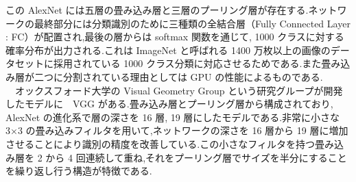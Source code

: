 この AlexNet には五層の畳み込み層と三層のプーリング層が存在する.ネットワークの最終部分には分類識別のために三種類の全結合層（Fully Connected Layer : FC）が配置され,最後の層からは softmax 関数を通じて, 1000 クラスに対する確率分布が出力される.これは ImageNet と呼ばれる 1400 万枚以上の画像のデータセットに採用されている 1000 クラス分類に対応させるためである.また畳み込み層が二つに分割されている理由としては GPU の性能によるものである.\\
　オックスフォード大学の Visual Geometry Group という研究グループが開発したモデルに　VGG がある.畳み込み層とプーリング層から構成されており, AlexNet の進化系で層の深さを 16 層, 19 層にしたモデルである.非常に小さな 3×3 の畳み込みフィルタを用いて,ネットワークの深さを 16 層から 19 層に増加させることにより識別の精度を改善している.この小さなフィルタを持つ畳み込み層を 2 から 4 回連続して重ね,それをプーリング層でサイズを半分にすることを繰り返し行う構造が特徴である.\\
